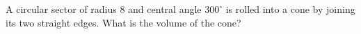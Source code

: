 A circular sector of radius $8$ and central angle $300^\circ$ is rolled into a cone by joining its two straight edges. What is the volume of the cone?
